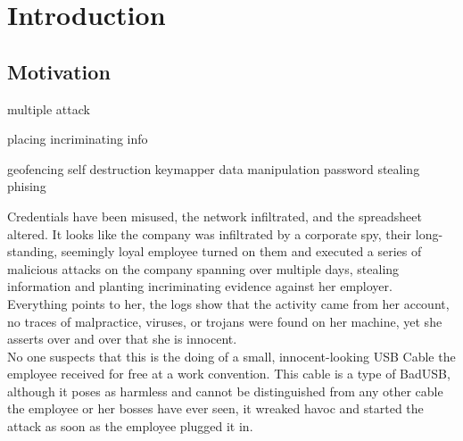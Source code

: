\chapter{Introduction}

\section{Motivation}

multiple attack 

placing incriminating info

geofencing
self destruction
keymapper
data manipulation
password stealing
phising

Credentials have been misused, the network infiltrated, and the spreadsheet altered. It looks like the company was infiltrated by a corporate spy, their long-standing, seemingly loyal employee turned on them and executed a series of malicious attacks on the company spanning over multiple days, stealing information and planting incriminating evidence against her employer. Everything points to her, the logs show that the activity came from her account, no traces of malpractice, viruses, or trojans were found on her machine, yet she asserts over and over that she is innocent. \\
No one suspects that this is the doing of a small, innocent-looking USB Cable the employee received for free at a work convention. This cable is a type of BadUSB, although it poses as harmless and cannot be distinguished from any other cable the employee or her bosses have ever seen, it wreaked havoc and started the attack as soon as the employee plugged it in. \\
